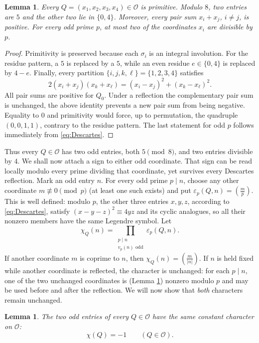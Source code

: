 \documentclass[12pt]{article}
\newtheorem{lemma}[theorem]{Lemma}
\theoremstyle{definition}
\theoremstyle{remark}
\newcommand{\OO}{\mathcal O}
\newcommand{\symb}[2]{\left(\frac{#1}{#2}\right)}
\begin{document}
\begin{lemma}\label{lem1}
Every $Q=(x_1,x_2,x_3,x_4)\in\OO$ is primitive. Modulo $8$, two entries are
$5$ and the other two lie in $\{0,4\}$. Moreover, every pair sum
$x_i+x_j$, $i\neq j$, is positive. For every odd prime $p$, at most two of the
coordinates $x_i$ are divisible by $p$.
\end{lemma}
\begin{proof}
Primitivity is preserved because each $\sigma_i$ is an integral involution.
For the residue pattern, a $5$ is replaced by a $5$, while an even residue
$e\in\{0,4\}$ is replaced by $4-e$. Finally, every partition
$\{i,j,k,\ell\}=\{1,2,3,4\}$ satisfies
\begin{equation*}
2(x_i+x_j)(x_k+x_\ell)=(x_i-x_j)^2+(x_k-x_\ell)^2.
\end{equation*}
All pair sums are positive for $Q_0$. Under a reflection the complementary
pair sum is unchanged, the above identity prevents a new pair sum from
being negative. Equality to $0$ and primitivity would force, up to permutation, the
quadruple $(0,0,1,1)$, contrary to the residue pattern. The last statement for odd $p$ follows immediately from \eqref{eq:Descartes}.
\end{proof}
Thus every $Q\in\OO$ has two odd entries, both $5\pmod8$, and two entries
divisible by $4$.  We shall now attach a sign to either odd coordinate. That sign can be read locally modulo every prime dividing that coordinate, yet survives every Descartes reflection. Mark an odd entry $n$. For every odd prime $p\mid n$,
choose any other coordinate $m\not\equiv0\pmod p$ (at least one such exists) and put
$\varepsilon_p(Q,n)=\symb{m}{p}$. This is well defined: modulo $p$, the
other three entries $x,y,z$, according to \eqref{eq:Descartes}, satisfy $(x-y-z)^2\equiv4yz$ and its cyclic
analogues, so all their nonzero members have the same Legendre symbol. Let
\begin{equation}\label{eq:character}
\chi_Q(n)=\prod_{\substack{p\mid n\\v_p(n)\text{ odd}}}
\varepsilon_p(Q,n).
\end{equation}
If another coordinate $m$ is coprime to $n$, then
$\chi_Q(n)=\symb{m}{|n|}$. If $n$ is held fixed while another coordinate is
reflected, the character is unchanged: for each $p\mid n$, one of the two
unchanged coordinates is (Lemma \ref{lem1}) nonzero modulo $p$ and may be used before
and after the reflection. We will now show that \emph{both} characters remain unchanged.

\begin{lemma}\label{lem:two-odd}
The two odd entries of every $Q\in\OO$ have the same constant character on $\OO$:
\begin{equation*}
\chi(Q)=-1\qquad(Q\in\OO).
\end{equation*}
\end{lemma}
\end{document}
